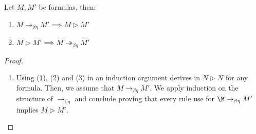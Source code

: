 \begin{lemma}
  Let $M,M'$ be formulas, then:
  \begin{enumerate}
  \item $M\to_{\beta\eta} M'\implies M \triangleright M'$
  \item $M\triangleright M'\implies M \twoheadrightarrow_{\beta\eta} M'$
  \end{enumerate}
\end{lemma}
\begin{proof}
  \begin{enumerate}
  \item Using (1), (2) and (3) in an induction argument derives in $N\triangleright N$ for any formula. Then, we assume that $M\to_{\beta\eta}M'$. We  apply induction on the structure of $\to_{\beta\eta}$ and conclude proving that every rule use for $\M \to_{\beta\eta} M'$ implies $M \triangleright M'$.


\end{enumerate}
\end{proof}
